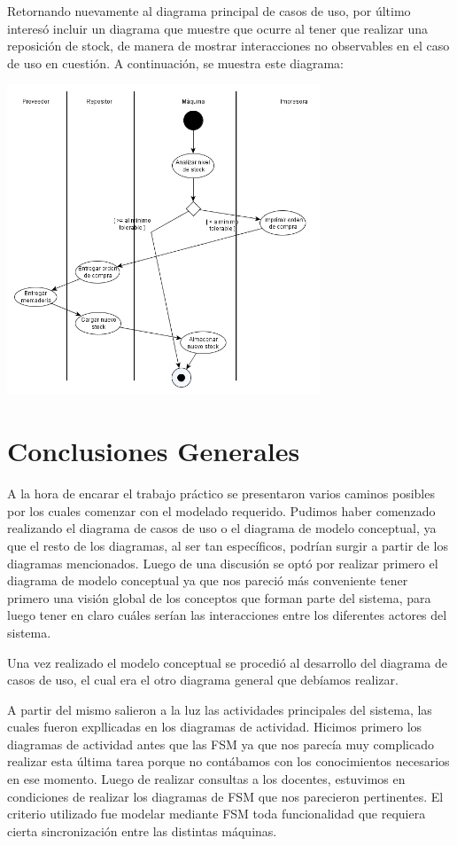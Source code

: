 \documentclass[a4paper,11pt] {article}
\begin{document}
Retornando nuevamente al diagrama principal de casos de uso, por \'ultimo interes\'o incluir un diagrama que muestre que ocurre al tener que realizar una reposici\'on de stock, de manera de mostrar interacciones no observables en el caso de uso en cuesti\'on. A continuaci\'on, se muestra este diagrama:

\begin{center}
 \includegraphics[width=0.7\textwidth]{Diagramas/DiagramaActividadReponerStock.png}
\end{center}

\section*{Conclusiones Generales}

A la hora de encarar el trabajo pr\'actico se presentaron varios caminos posibles por los cuales
comenzar con el modelado requerido. Pudimos haber comenzado realizando el diagrama de
casos de uso o el diagrama de modelo conceptual, ya que el resto de los diagramas, al ser tan espec\'ificos, podr\'ian surgir a partir de los diagramas mencionados. Luego de una discusi\'on se opt\'o por realizar primero el diagrama de modelo conceptual ya que nos pareci\'o m\'as conveniente tener primero una visi\'on global de los conceptos que forman parte del sistema, para luego tener en claro cu\'ales ser\'ian las interacciones entre los diferentes actores del sistema.

Una vez realizado el modelo conceptual se procedi\'o al desarrollo del diagrama de casos de uso, el cual era el otro diagrama general que deb\'iamos realizar.

A partir del mismo salieron a la luz las actividades principales del sistema, las cuales fueron expllicadas en los diagramas de actividad. Hicimos primero los diagramas de actividad antes que las FSM ya que nos parec\'ia muy complicado realizar esta \'ultima tarea porque no cont\'abamos con los conocimientos necesarios en ese momento. Luego de realizar consultas a los docentes, estuvimos en condiciones de realizar los diagramas de FSM que nos parecieron pertinentes. El criterio utilizado fue modelar mediante FSM toda funcionalidad que requiera cierta sincronizaci\'on entre las distintas m\'aquinas.
\end{document}

